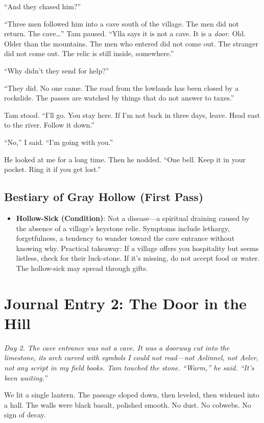 \documentclass[11pt]{article}
\begin{document}
``And they chased him?''

``Three men followed him into a cave south of the village. The men did not return. The cave\dots'' Tam paused. ``Ylla says it is not a cave. It is a \textit{door}. Old. Older than the mountains. The men who entered did not come out. The stranger did not come out. The relic is still inside, somewhere.''

``Why didn't they send for help?''

``They did. No one came. The road from the lowlands has been closed by a rockslide. The passes are watched by things that do not answer to taxes.''

Tam stood. ``I'll go. You stay here. If I'm not back in three days, leave. Head east to the river. Follow it down.''

``No,'' I said. ``I'm going with you.''

He looked at me for a long time. Then he nodded. ``One bell. Keep it in your pocket. Ring it if you get lost.''

\subsection*{Bestiary of Gray Hollow (First Pass)}
\begin{itemize}
    \item \textbf{Hollow-Sick (Condition)}: Not a disease---a spiritual draining caused by the absence of a village's keystone relic. Symptoms include lethargy, forgetfulness, a tendency to wander toward the cave entrance without knowing why. Practical takeaway: If a village offers you hospitality but seems listless, check for their luck-stone. If it's missing, do not accept food or water. The hollow-sick may spread through gifts.
\end{itemize}

\section*{Journal Entry 2: The Door in the Hill}
\textit{Day 2. The cave entrance was not a cave. It was a doorway cut into the limestone, its arch carved with symbols I could not read---not Aelinnel, not Aeler, not any script in my field books. Tam touched the stone. ``Warm,'' he said. ``It's been waiting.''}

We lit a single lantern. The passage sloped down, then leveled, then widened into a hall. The walls were black basalt, polished smooth. No dust. No cobwebs. No sign of decay.
\end{document}
